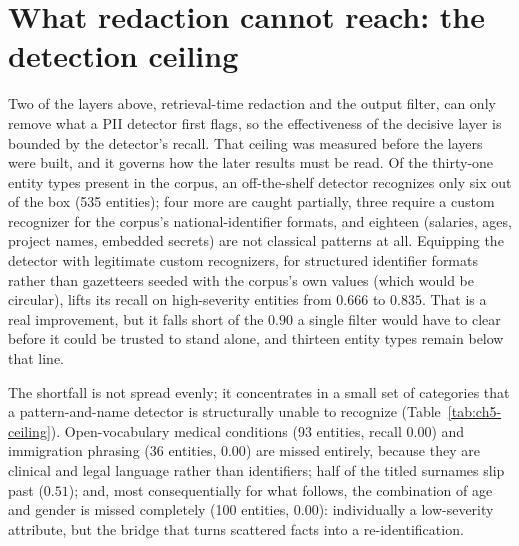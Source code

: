 \section{What redaction cannot reach: the detection ceiling}
\label{sec:ch5-ceiling}

Two of the layers above, retrieval-time redaction and the output filter, can only remove
what a PII detector first flags, so the effectiveness of the decisive layer is bounded by the
detector's recall. That ceiling was measured before the layers were built, and it governs how
the later results must be read. Of the thirty-one entity types present in the corpus, an
off-the-shelf detector recognizes only six out of the box (535 entities); four more are caught
partially, three require a custom recognizer for the corpus's national-identifier formats, and
eighteen (salaries, ages, project names, embedded secrets) are not classical patterns at
all. Equipping the detector with legitimate custom recognizers, for structured identifier
formats rather than gazetteers seeded with the corpus's own values (which would be circular),
lifts its recall on high-severity entities from $0.666$ to $0.835$. That is a real
improvement, but it falls short of the $0.90$ a single filter would have to clear before it
could be trusted to stand alone, and thirteen entity types remain below that line.

The shortfall is not spread evenly; it concentrates in a small set of categories that a
pattern-and-name detector is structurally unable to recognize (Table~\ref{tab:ch5-ceiling}).
Open-vocabulary medical conditions (93 entities, recall $0.00$) and immigration phrasing
(36 entities, $0.00$) are missed entirely, because they are clinical and legal language rather
than identifiers; half of the titled surnames slip past ($0.51$); and, most consequentially
for what follows, the combination of age and gender is missed completely (100 entities,
$0.00$): individually a low-severity attribute, but the bridge that turns scattered facts into
a re-identification.

